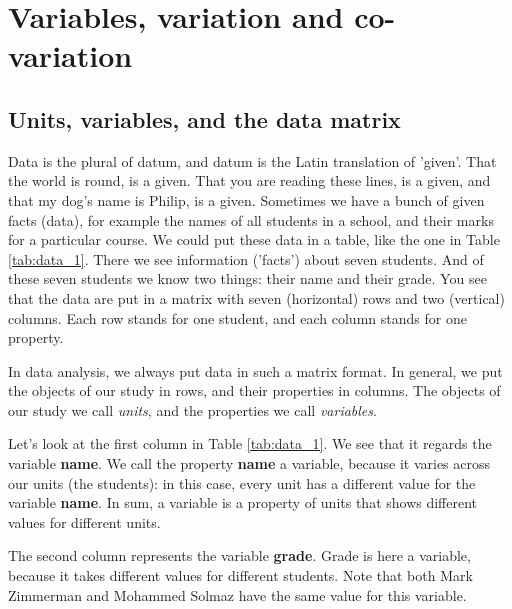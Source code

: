 \chapter{Variables, variation and co-variation} \label{chap:intro}


\section{Units, variables, and the data matrix}



Data is the plural of datum, and datum is the Latin translation of 'given'. That the world is round, is a given. That you are reading these lines, is a given, and that my dog's name is Philip, is a given. Sometimes we have a bunch of given facts (data), for example the names of all students in a school, and their marks for a particular course. We could put these data in a table, like the one in Table \ref{tab:data_1}. There we see information ('facts') about seven students. And of these seven students we know two things: their name and their grade. You see that the data are put in a matrix with seven (horizontal) rows and two (vertical) columns. Each row stands for one student, and each column stands for one property.

In data analysis, we always put data in such a matrix format. In general, we put the objects of our study in rows, and their properties in columns. The objects of our study we call \textit{units}, and the properties we call \textit{variables}.

\begin{kframe}


{\ttfamily\noindent\bfseries{}}\end{kframe}

Let's look at the first column in Table \ref{tab:data_1}. We see that it regards the variable \textbf{name}. We call the property \textbf{name} a variable, because it varies across our units (the students): in this case, every unit has a different value for the variable \textbf{name}. In sum, a variable is a property of units that shows different values for different units.

The second column represents the variable \textbf{grade}. Grade is here a variable, because it takes different values for different students. Note that both Mark Zimmerman and Mohammed Solmaz have the same value for this variable.

